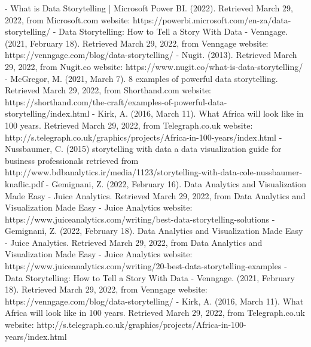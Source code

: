 \documentclass[twoside,twocolumn]{article}
\begin{document}
\begin{thebibliography}{XXX0000}
    \bibitem - What is Data Storytelling | Microsoft Power BI. (2022). Retrieved March 29, 2022, from Microsoft.com website: https://powerbi.microsoft.com/en-za/data-storytelling/
    \bibitem - Data Storytelling: How to Tell a Story With Data - Venngage. (2021, February 18). Retrieved March 29, 2022, from Venngage website: https://venngage.com/blog/data-storytelling/ 
    \bibitem - Nugit. (2013). Retrieved March 29, 2022, from Nugit.co website: https://www.nugit.co/what-is-data-storytelling/
    \bibitem - McGregor, M. (2021, March 7). 8 examples of powerful data storytelling. Retrieved March 29, 2022, from Shorthand.com website: https://shorthand.com/the-craft/examples-of-powerful-data-storytelling/index.html
    \bibitem - Kirk, A. (2016, March 11). What Africa will look like in 100 years. Retrieved March 29, 2022, from Telegraph.co.uk website: http://s.telegraph.co.uk/graphics/projects/Africa-in-100-years/index.html
    \bibitem - Nussbaumer, C. (2015) storytelling with data a data visualization guide for business professionals retrieved from  http://www.bdbanalytics.ir/media/1123/storytelling-with-data-cole-nussbaumer-knaflic.pdf
    \bibitem - Gemignani, Z. (2022, February 16). Data Analytics and Visualization Made Easy - Juice Analytics. Retrieved March 29, 2022, from Data Analytics and Visualization Made Easy - Juice Analytics website: https://www.juiceanalytics.com/writing/best-data-storytelling-solutions
    \bibitem - Gemignani, Z. (2022, February 18). Data Analytics and Visualization Made Easy - Juice Analytics. Retrieved March 29, 2022, from Data Analytics and Visualization Made Easy - Juice Analytics website: https://www.juiceanalytics.com/writing/20-best-data-storytelling-examples
    \bibitem - Data Storytelling: How to Tell a Story With Data - Venngage. (2021, February 18). Retrieved March 29, 2022, from Venngage website: https://venngage.com/blog/data-storytelling/ 
    \bibitem -  Kirk, A. (2016, March 11). What Africa will look like in 100 years. Retrieved March 29, 2022, from Telegraph.co.uk website: http://s.telegraph.co.uk/graphics/projects/Africa-in-100-years/index.html

  

\end{thebibliography}

\end{document}
